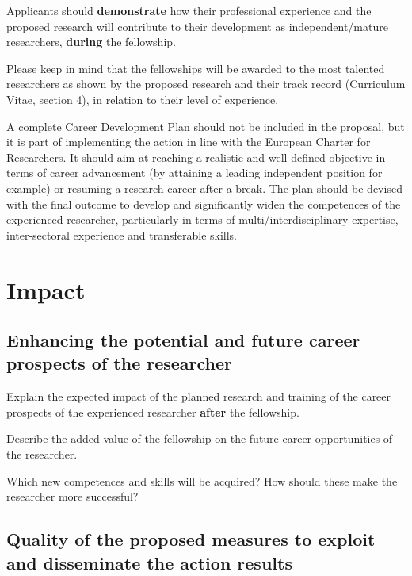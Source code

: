Applicants should \textbf{demonstrate} how their professional
experience and the proposed research will contribute to their
development as independent/mature researchers, \textbf{during} the
fellowship. 

Please keep in mind that the fellowships will be awarded to the
most talented researchers as shown by the proposed research and
their track record (Curriculum Vitae, section 4), in relation to
their level of experience.

\medskip\noindent
A complete Career Development Plan should not be included in the
proposal, but it is part of implementing the action in line with
the European Charter for Researchers. It should aim at reaching a
realistic and well-defined objective in terms of career
advancement (by attaining a leading independent position for
example) or resuming a research career after a break. The plan
should be devised with the final outcome to develop and
significantly widen the competences of the experienced researcher,
particularly in terms of multi/interdisciplinary expertise,
inter-sectoral experience and transferable skills.

\newpage

\section{Impact}
\label{sec:impact}

\subsection{Enhancing the potential and future career prospects of
the researcher}
  \label{sec:impact_researcher}

Explain the expected impact of the planned research and training
of the career prospects of the experienced researcher
\textbf{after} the fellowship.

\medskip\noindent
Describe the added value of the fellowship on the future career
opportunities of the researcher. 

\medskip\noindent
Which new competences and skills will be acquired? How should
these make the researcher more successful? 

\subsection{Quality of the proposed measures to exploit and
disseminate the action results}
  \label{sec:impact_dissemination}

